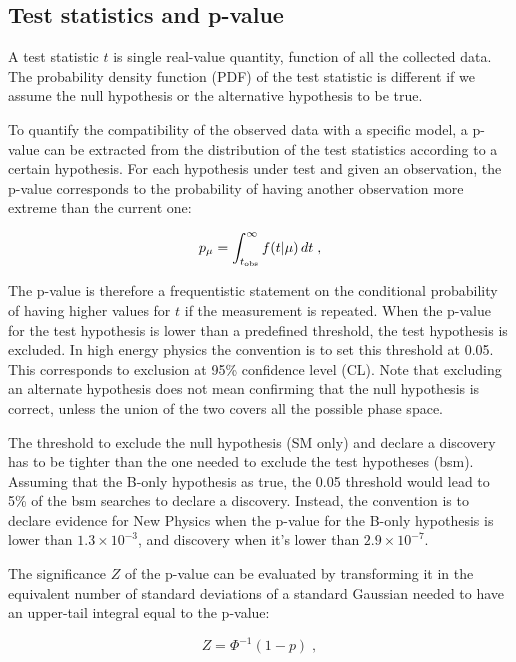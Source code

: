 \subsection{Test statistics and p-value}

 A test statistic $t$ is single real-value quantity, function of all the collected data. The probability density function (PDF) of the test statistic is different if we assume the null hypothesis or the alternative hypothesis to be true.

To quantify the compatibility of the observed data with a specific model, a p-value can be extracted from the distribution of the test statistics according to a certain hypothesis. For each hypothesis under test and given an observation, the p-value corresponds to the probability of having another observation more extreme than the current one:

\begin{equation}
\label{eq:stat:pval}
p_{\mu} = \int_{t_{{\rm obs}}}^{\infty} f(t | \mu ) \,
d t \; ,
\end{equation}

The p-value is therefore a frequentistic statement on the conditional probability of having higher values for $t$ if the measurement is repeated. When the p-value for the test hypothesis is lower than a predefined threshold, the test hypothesis is excluded. In high energy physics the convention is to set this threshold at 0.05. This corresponds to exclusion at 95\% confidence level (CL). Note that excluding an alternate hypothesis does not mean confirming that the null hypothesis is correct, unless the union of the two covers all the possible phase space.

The threshold to exclude the null hypothesis (SM only) and declare a discovery has to be tighter than the one needed to exclude the test hypotheses (\gls{bsm}). Assuming that the B-only hypothesis as true, the 0.05 threshold would lead to 5\% of the \gls{bsm} searches to declare a discovery. Instead, the convention is to declare evidence for New Physics when the p-value for the B-only hypothesis is lower than $1.3 \times 10^{-3}$, and discovery when it's lower than $2.9 \times 10^{-7}$.

The significance $Z$ of the p-value can be evaluated by transforming it in the equivalent number of standard deviations of a standard Gaussian needed to have an upper-tail integral equal to the p-value:

\begin{equation}
\label{eq:stat:sig}
Z = \Phi^{-1}(1-p) \; ,
\end{equation} 


